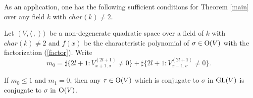\documentclass[12pt]{amsart}
\begin{document}
As an application, one has the following sufficient conditions for Theorem \ref{main} over any field $k$ with $char(k)\neq 2$. 

\begin{cor} \label{hyper}  Let $(V,  \langle \  , \  \rangle)$ be a non-degenerate quadratic space over a field of $k$ with $char(k)\neq 2$ and $f(x)$ be the characteristic polynomial of $\sigma\in {\rm O}(V)$  with the factorization (\ref{factor}).  Write 
$$ m_0= \sharp \{ 2l+1 : V_{x+1, \sigma}^{(2l+1)} \neq 0  \} + \sharp \{ 2l+1: V_{x-1, \sigma}^{(2l+1)} \neq 0 \} . $$

If $m_0\leq 1$ and $m_1=0$, then any $\tau\in {\rm O}(V)$ which is conjugate to $\sigma$ in ${\rm GL}(V)$ is conjugate to $\sigma$ in ${\rm O}(V)$.
\end{cor}
\end{document}
